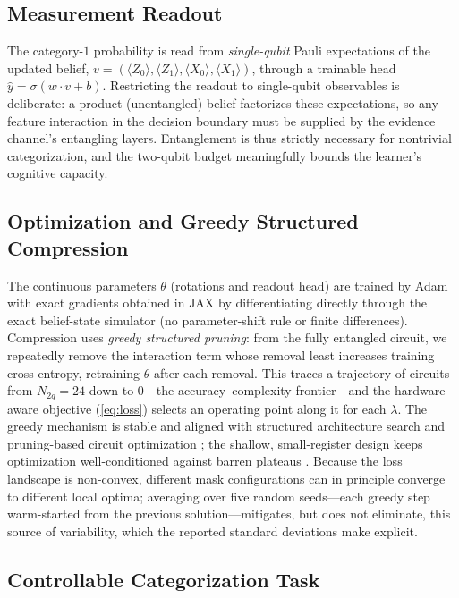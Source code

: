 \documentclass[conference]{IEEEtran}
\begin{document}
\subsection{Measurement Readout}
\label{sec:readout}

The category-$1$ probability is read from \emph{single-qubit} Pauli expectations of the
updated belief, $v=(\langle Z_0\rangle,\langle Z_1\rangle,\langle X_0\rangle,\langle
X_1\rangle)$, through a trainable head $\hat y = \sigma(w\cdot v + b)$. Restricting the
readout to single-qubit observables is deliberate: a product (unentangled) belief
factorizes these expectations, so any feature interaction in the decision boundary must be
supplied by the evidence channel's entangling layers. Entanglement is thus strictly
necessary for nontrivial categorization, and the two-qubit budget meaningfully bounds the
learner's cognitive capacity.

\subsection{Optimization and Greedy Structured Compression}

The continuous parameters $\theta$ (rotations and readout head) are trained by Adam with
exact gradients obtained in JAX by differentiating directly through the exact
belief-state simulator (no parameter-shift rule or finite differences).
Compression uses \emph{greedy structured pruning}: from the fully entangled circuit, we
repeatedly remove the interaction term whose removal least increases training
cross-entropy, retraining $\theta$ after each removal. This traces a trajectory of
circuits from $N_{2q}=24$ down to $0$---the accuracy--complexity frontier---and the
hardware-aware objective (\ref{eq:loss}) selects an operating point along it for each
$\lambda$. The greedy mechanism is stable and aligned with structured architecture search
\cite{b16,b17} and pruning-based circuit optimization \cite{b29}; the shallow,
small-register design keeps optimization well-conditioned against barren plateaus
\cite{b18}. Because the loss landscape is non-convex, different mask configurations can in
principle converge to different local optima; averaging over five random seeds---each
greedy step warm-started from the previous solution---mitigates, but does not eliminate,
this source of variability, which the reported standard deviations make explicit.

\subsection{Controllable Categorization Task}
\label{sec:data}
\end{document}

